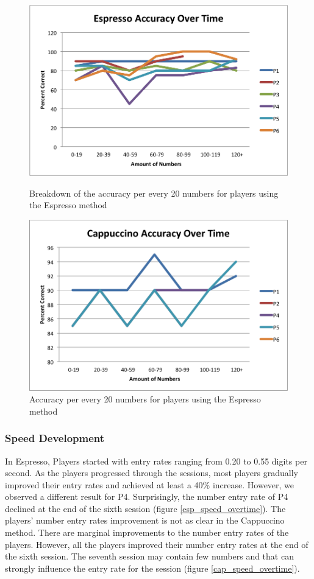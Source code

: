 \begin{figure}[!htbp]
  \centering
  \includegraphics[width=1.0\textwidth]{figures/esp_acc_overtime.png}
  \caption{Breakdown of the accuracy per every 20 numbers for players using the Espresso method}
  \label{esp_accuracy_overtime}
  \includegraphics[width=1.0\textwidth]{figures/cap_accuracy_overtime.png}
  \caption{Accuracy per every 20 numbers for players using the Espresso method}
  \label{cap_accuracy_overtime}
\end{figure}

\subsubsection{Speed Development}
In Espresso, Players started with entry rates ranging from 0.20 to 0.55 digits per second. As the players progressed through the sessions, most players gradually improved their entry rates and achieved at least a 40\% increase. However, we observed a different result for P4. Surprisingly, the number entry rate of P4 declined at the end of the sixth session (figure \ref{esp_speed_overtime}). The players' number entry rates improvement is not as clear in the Cappuccino method. There are marginal improvements to the number entry rates of the players. However, all the players improved their number entry rates at the end of the sixth session. The seventh session may contain few numbers and that can strongly influence the entry rate for the session (figure \ref{cap_speed_overtime}).

